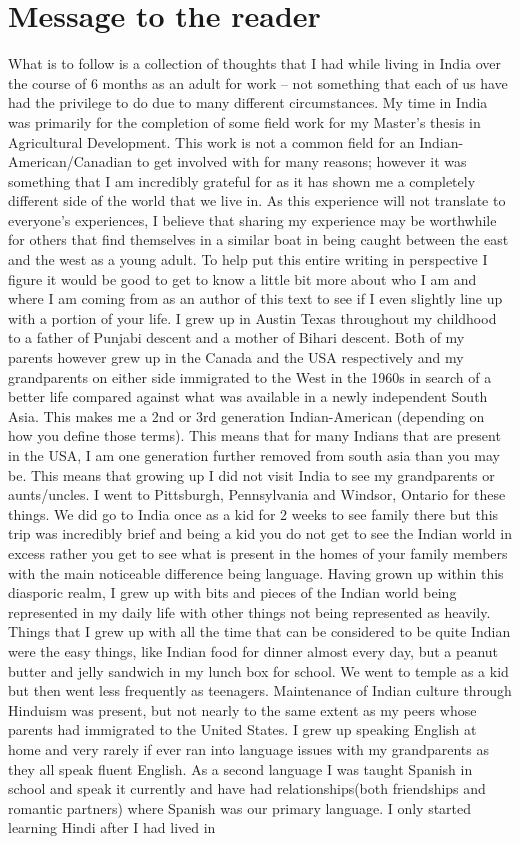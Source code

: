 \chapter{Message to the reader}
	What is to follow is a collection of thoughts that I had while living in India over the course of 6 months as an adult for work – not something that each of us have had the privilege to do due to many different circumstances. My time in India was primarily for the completion of some field work for my Master’s thesis in Agricultural Development. This work is not a common field for an Indian-American/Canadian to get involved with for many reasons; however it was something that I am incredibly grateful for as it has shown me a completely different side of the world that we live in. As this experience will not translate to everyone’s experiences, I believe that sharing my experience may be worthwhile for others that find themselves in a similar boat in being caught between the east and the west as a young adult. To help put this entire writing in perspective I figure it would be good to get to know a little bit more about who I am and where I am coming from as an author of this text to see if I even slightly line up with a portion of your life. I grew up in Austin Texas throughout my childhood to a father of Punjabi descent and a mother of Bihari descent. Both of my parents however grew up in the Canada and the USA respectively and my grandparents on either side immigrated to the West in the 1960s in search of a better life compared against what was available in a newly independent South Asia. This makes me a 2nd or 3rd generation Indian-American (depending on how you define those terms). This means that for many Indians that are present in the USA, I am one generation further removed from south asia than you may be. This means that growing up I did not visit India to see my grandparents or aunts/uncles. I went to Pittsburgh, Pennsylvania and Windsor, Ontario for these things. We did go to India once as a kid for 2 weeks to see family there but this trip was incredibly brief and being a kid you do not get to see the Indian world in excess rather you get to see what is present in the homes of your family members with the main noticeable difference being language. Having grown up within this diasporic realm, I grew up with bits and pieces of the Indian world being represented in my daily life with other things not being represented as heavily. Things that I grew up with all the time that can be considered to be quite Indian were the easy things, like Indian food for dinner almost every day, but a peanut butter and jelly sandwich in my lunch box for school. We went to temple as a kid but then went less frequently as teenagers. Maintenance of Indian culture through Hinduism was present, but not nearly to the same extent as my peers whose parents had immigrated to the United States. I grew up speaking English at home and very rarely if ever ran into language issues with my grandparents as they all speak fluent English. As a second language I was taught Spanish in school and speak it currently and have had relationships(both friendships and romantic partners) where Spanish was our primary language. I only started learning Hindi after I had lived in 